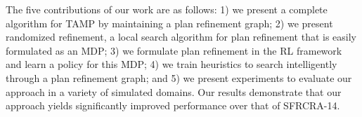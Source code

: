 The five contributions of our work are as follows: 1) we present a complete algorithm for TAMP
by maintaining a plan refinement graph;
2) we present randomized refinement, a local search
algorithm for plan refinement that is easily formulated as an MDP; 3) we formulate plan refinement in the
RL framework and learn a policy for this MDP; 4) we train heuristics to search intelligently
through a plan refinement graph; and 5) we present experiments to evaluate our approach in a variety of simulated
domains. Our results demonstrate that our approach yields significantly improved
performance over that of SFRCRA-14.
